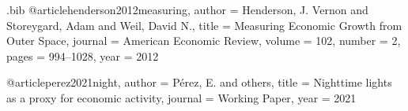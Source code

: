 \begin{filecontents*}{\jobname.bib}
@article{henderson2012measuring,
  author  = {Henderson, J. Vernon and Storeygard, Adam and Weil, David N.},
  title   = {Measuring Economic Growth from Outer Space},
  journal = {American Economic Review},
  volume  = {102},
  number  = {2},
  pages   = {994--1028},
  year    = {2012}
}

@article{perez2021night,
  author  = {P{\'e}rez, E. and others},
  title   = {Nighttime lights as a proxy for economic activity},
  journal = {Working Paper},
  year    = {2021}
}
\end{filecontents*}

\documentclass[11pt,a4paper,french]{article}

\usepackage[utf8]{inputenc}
\usepackage[T1]{fontenc}

\usepackage{fix-cm}

\usepackage{lmodern}

\usepackage[authoryear,round]{natbib}
\usepackage{babel}
\usepackage[margin=2.5cm,footskip=1.1cm]{geometry}
\usepackage{graphicx}
\usepackage{xcolor}
\usepackage{booktabs}
\usepackage{array}
\usepackage{amsmath,amssymb}
\usepackage{titlesec}
\usepackage{fancyhdr}
\usepackage{caption}
\usepackage[section]{placeins}

\usepackage{microtype}

\usepackage{mdframed} 


\setlength{\parindent}{0pt}
\setlength{\parskip}{0.45em}
\setlength{\emergencystretch}{3em}
\renewcommand{\arraystretch}{1.12}

\titleformat{\section}
  {\normalfont\Large\bfseries\color{navyblue}}
  {\thesection}{0.8em}{}
  [\vspace{0.25ex}{\color{accentblue}\titlerule}]
\titleformat{\subsection}
  {\normalfont\large\bfseries\color{accentblue}}
  {\thesubsection}{0.8em}{}

